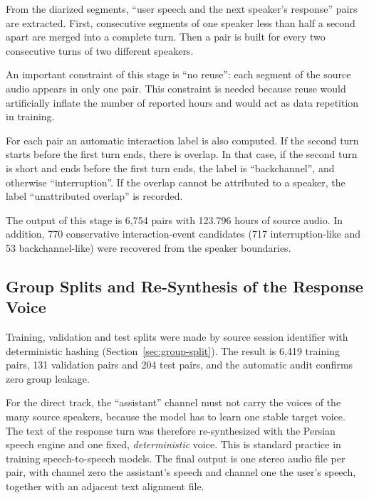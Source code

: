 From the diarized segments, ``user speech and the next speaker's response'' pairs are
extracted. First, consecutive segments of one speaker less than half a second apart
are merged into a complete turn. Then a pair is built for every two consecutive turns
of two different speakers.

An important constraint of this stage is ``no reuse'': each segment of the source
audio appears in only one pair. This constraint is needed because reuse would
artificially inflate the number of reported hours and would act as data repetition in
training.

For each pair an automatic interaction label is also computed. If the second turn
starts before the first turn ends, there is overlap. In that case, if the second turn
is short and ends before the first turn ends, the label is ``backchannel'', and
otherwise ``interruption''. If the overlap cannot be attributed to a speaker, the
label ``unattributed overlap'' is recorded.

The output of this stage is 6,754 pairs with 123.796 hours of source audio. In
addition, 770 conservative interaction-event candidates (717 interruption-like and 53
backchannel-like) were recovered from the speaker boundaries.


\subsection{Group Splits and Re-Synthesis of the Response Voice}

Training, validation and test splits were made by source session identifier with
deterministic hashing (Section~\ref{sec:group-split}). The result is 6,419 training
pairs, 131 validation pairs and 204 test pairs, and the automatic audit confirms zero
group leakage.

For the direct track, the ``assistant'' channel must not carry the voices of the many
source speakers, because the model has to learn one stable target voice. The text of
the response turn was therefore re-synthesized with the Persian speech engine and one
fixed, \emph{deterministic} voice. This is standard practice in training
speech-to-speech models. The final output is one stereo audio file per pair, with
channel zero the assistant's speech and channel one the user's speech, together with
an adjacent text alignment file.

